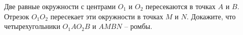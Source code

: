 \begin{ex}
	\begin{condition}
		Две равные окружности с центрами \( O_1 \) и \( O_2 \) пересекаются в точках \( A \) и \( B \). Отрезок \( O_1O_2  \) пересекает эти окружности	в точках \( M  \) и \( N  \). Докажите, что четырехугольники \( O_1AO_2B \)	и \( AMBN \) – ромбы.
	\end{condition}
\end{ex}